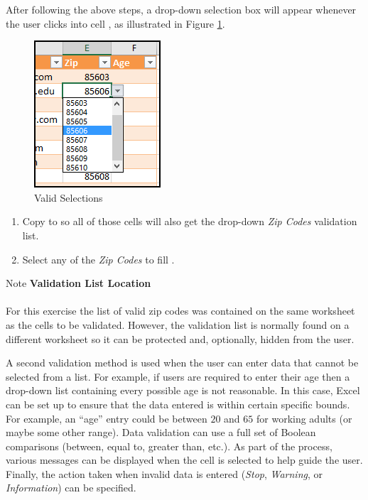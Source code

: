 After following the above steps, a drop-down selection box will appear whenever the user clicks into cell , as illustrated in Figure \ref{07:fig38}. 

\begin{figure}[H]
	\centering
	\includegraphics[width=\maxwidth{.95\linewidth}]{gfx/ch07_fig38}
	\caption{Valid Selections}
	\label{07:fig38}
\end{figure}

\begin{enumerate}[resume]
	\item Copy  to  so all of those cells will also get the drop-down \textit{Zip Codes} validation list.
	\item Select any of the \textit{Zip Codes} to fill .
\end{enumerate}

\begin{center}
	\begin{infobox}{Note}
		\textbf{Validation List Location}
		\\
		\\
		For this exercise the list of valid zip codes was contained on the same worksheet as the cells to be validated. However, the validation list is normally found on a different worksheet so it can be protected and, optionally, hidden from the user.
	\end{infobox}
\end{center}

A second validation method is used when the user can enter data that cannot be selected from a list. For example, if users are required to enter their age then a drop-down list containing every possible age is not reasonable. In this case, Excel can be set up to ensure that the data entered is within certain specific bounds. For example, an ``age'' entry could be between $ 20 $ and $ 65 $ for working adults (or maybe some other range). Data validation can use a full set of Boolean comparisons (between, equal to, greater than, etc.). As part of the process, various messages can be displayed when the cell is selected to help guide the user. Finally, the action taken when invalid data is entered (\textit{Stop}, \textit{Warning}, or \textit{Information}) can be specified.

